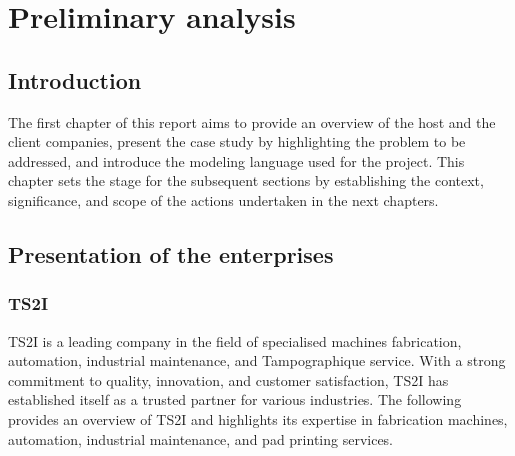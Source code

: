 \chapter{Preliminary analysis}

\section*{Introduction}

\hspace*{\parindent} The first chapter of this report aims to provide an overview of the host and the client companies,
present the case study by highlighting the problem to be addressed, and introduce the modeling language
used for the project. This chapter sets the stage for the subsequent sections by establishing the
context, significance, and scope of the actions undertaken in the next chapters.

\section{\fontsize{15}{18}\selectfont Presentation of the enterprises}

\subsection{TS2I}

\hspace*{\parindent} TS2I is a leading company in the field of specialised machines fabrication, automation, industrial
maintenance, and Tampographique service. With a strong commitment to quality, innovation, and
customer satisfaction, TS2I has established itself as a trusted partner for various industries.
The following provides an overview of TS2I and highlights its expertise in fabrication machines,
automation, industrial maintenance, and pad printing services.

